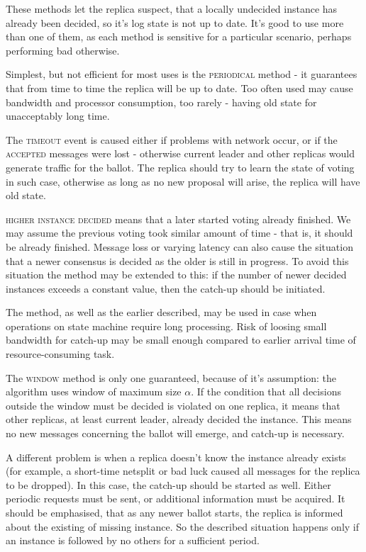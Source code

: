 These methods let the replica suspect, that a locally undecided instance has already been decided, so it's log state is not up to date. It's good to use more than one of them, as each method is sensitive for a particular scenario, perhaps performing bad otherwise.

Simplest, but not efficient for most uses is the \textsc{periodical} method - it guarantees that from time to time the replica will be up to date.
Too often used may cause bandwidth and processor consumption, too rarely - having old state for unacceptably long time.

The \textsc{timeout} event is caused either if problems with network occur, or if the \textsc{accepted} messages were lost - otherwise current leader and other replicas would generate traffic for the ballot. The replica should try to learn the state of voting in such case, otherwise as long as no new proposal will arise, the replica will have old state.

\textsc{higher instance decided} means that a later started voting already finished. We may assume the previous voting took similar amount of time - that is, it should be already finished. Message loss or varying latency can also cause the situation that a newer consensus is decided as the older is still in progress. To avoid this situation the method may be extended to this: if the number of newer decided instances exceeds a constant value, then the catch-up should be initiated.

The method, as well as the earlier described, may be used in case when operations on state machine require long processing. Risk of loosing small bandwidth for catch-up may be small enough compared to earlier arrival time of resource-consuming task.

The \textsc{window} method is only one guaranteed, because of it's assumption: the algorithm uses window of maximum size $\alpha$. If the condition that all decisions outside the window must be decided is violated on one replica, it means that other replicas, at least current leader, already decided the instance. This means no new messages concerning the ballot will emerge, and catch-up is necessary.


A different problem is when a replica doesn't know the instance already exists (for example, a short-time netsplit or bad luck caused all messages for the replica to be dropped). In this case, the catch-up should be started as well.
Either periodic requests must be sent, or additional information must be acquired. It should be emphasised, that as any newer ballot starts, the replica is informed about the existing of missing instance. So the described situation happens only if an instance is followed by no others for a sufficient period.

